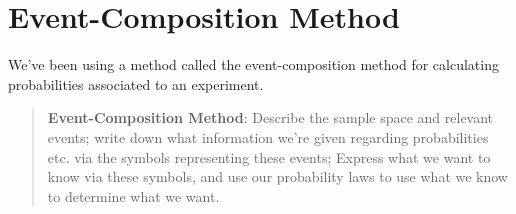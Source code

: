 \documentclass[
]{book}
\theoremstyle{definition}
\theoremstyle{definition}
\theoremstyle{definition}
\theoremstyle{definition}
\theoremstyle{remark}
\begin{document}
\section{Event-Composition Method}\label{event-composition-method}

We've been using a method called the event-composition method for calculating probabilities associated to an experiment.

\begin{quote}
\textbf{Event-Composition Method}: Describe the sample space and relevant events; write down what information we're given regarding probabilities etc. via the symbols representing these events; Express what we want to know via these symbols, and use our probability laws to use what we know to determine what we want.
\end{quote}
\end{document}

